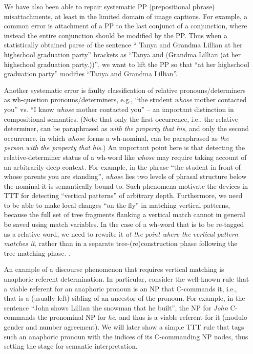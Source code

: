 \documentclass[a4,11pt]{article}
\begin{document}
We have also been able to repair systematic PP (prepositional phrase) misattachments, at least in the limited domain of image captions. For example, a common error is attachment of a PP to the last conjunct of a conjunction, where instead the entire conjunction should be modified by the PP.  Thus when a statistically obtained parse of the sentence `` Tanya and Grandma Lillian at her highschool graduation party'' brackets as ``Tanya and (Grandma Lillian (at her highschool graduation party.))'', we want to lift the PP so that ``at her highschool graduation party'' modifies ``Tanya and Grandma Lillian''. 

Another systematic error is faulty classification of relative pronouns/determiners as wh-question pronouns/determiners, e.g., ``the student {\it whose} mother contacted you'' vs. ``I know {\it whose} mother contacted you'' -- an important distinction in compositional semantics. (Note that only the first occurrence, i.e., the relative determiner, can be paraphrased as {\it with the property that his}, and only the second occurrence, in which {\it whose} forms a wh-nominal, can be paraphrased as {\it the person with the property that his}.) An important point here is that detecting the relative-determiner status of a wh-word like {\it whose} may require taking account of an arbitrarily deep context. For example, in the phrase ``the student in front of whose parents you are standing'', {\it whose} lies two levels of phrasal structure below the nominal it is semantically bound to. Such phenomena motivate the devices in TTT for detecting ``vertical patterns'' of arbitrary depth. Furthermore, we need to be able to make local changes ``on the fly'' in matching vertical patterns, because the full set of tree fragments flanking a vertical match cannot in general be saved using match variables. In the case of a wh-word that is to be re-tagged as a relative word, we need to rewrite it {\it at the point where the vertical pattern matches it}, rather than in a separate tree-(re)construction phase following the tree-matching phase.
. 

An example of a discourse phenomenon that requires vertical matching is anaphoric referent determination. In particular, consider the well-known rule that a viable referent for an anaphoric pronoun is an NP that C-commands it, i.e., that is a (usually left) sibling of an ancestor of the pronoun. For example, in the sentence ``John shows Lillian the snowman that he built'', the NP for {\it John} C-commands the pronominal NP for {\it he}, and thus is a viable referent for it (modulo gender and number agreement). We will later show a simple TTT rule that tags such an anaphoric pronoun with the indices of its C-commanding NP nodes, thus setting the stage for semantic interpretation.
\end{document}
